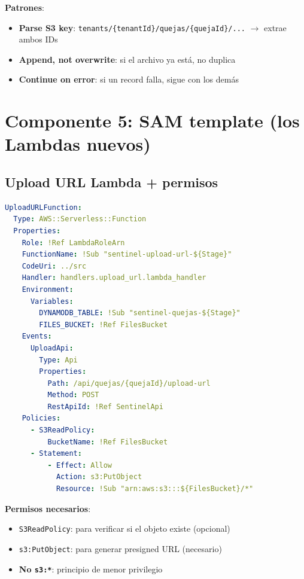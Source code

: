 \documentclass[11pt,a4paper,oneside]{article}
\newcommand{\ok}{\textcolor{okgreen}{\textbf{\checkmark}}}
\newcommand{\err}{\textcolor{errred}{\textbf{\ding{55}}}}
\begin{document}
\textbf{Patrones}:
\begin{itemize}
  \item \ok \textbf{Parse S3 key}: \texttt{tenants/\{tenantId\}/quejas/\{quejaId\}/...} $\rightarrow$ extrae ambos IDs
  \item \ok \textbf{Append, not overwrite}: si el archivo ya est\'a, no duplica
  \item \ok \textbf{Continue on error}: si un record falla, sigue con los dem\'as
\end{itemize}

\section{Componente 5: SAM template (los Lambdas nuevos)}

\subsection{Upload URL Lambda + permisos}

\begin{lstlisting}[language=yaml,caption={infra/template.yaml — UploadURLFunction}]
UploadURLFunction:
  Type: AWS::Serverless::Function
  Properties:
    Role: !Ref LambdaRoleArn
    FunctionName: !Sub "sentinel-upload-url-${Stage}"
    CodeUri: ../src
    Handler: handlers.upload_url.lambda_handler
    Environment:
      Variables:
        DYNAMODB_TABLE: !Sub "sentinel-quejas-${Stage}"
        FILES_BUCKET: !Ref FilesBucket
    Events:
      UploadApi:
        Type: Api
        Properties:
          Path: /api/quejas/{quejaId}/upload-url
          Method: POST
          RestApiId: !Ref SentinelApi
    Policies:
      - S3ReadPolicy:
          BucketName: !Ref FilesBucket
      - Statement:
          - Effect: Allow
            Action: s3:PutObject
            Resource: !Sub "arn:aws:s3:::${FilesBucket}/*"
\end{lstlisting}

\textbf{Permisos necesarios}:
\begin{itemize}
  \item \ok \texttt{S3ReadPolicy}: para verificar si el objeto existe (opcional)
  \item \ok \texttt{s3:PutObject}: para generar presigned URL (necesario)
  \item \err \textbf{No \texttt{s3:*}}: principio de menor privilegio
\end{itemize}
\end{document}
